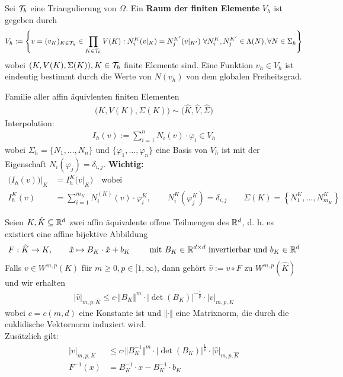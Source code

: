 \begin{definition}\enter
Sei $\mathcal{T}_h$ eine Triangulierung von $\Omega$. Ein \textbf{Raum der finiten Elemente} $V_h$ ist gegeben durch 
\begin{align*}
V_h:=\left\lbrace v=(v_{K})_{K\in\mathcal{T}_h}\in\prod\limits_{K\in\mathcal{T}_h} V(K):N_i^K(v|_K)=N_j^{K'}(v|_{K'})~\forall N_i^K,N_j^{K'}\in\Lambda(N),\forall N\in\Sigma_h\right\rbrace
\end{align*}
wobei $(K,V(K),\Sigma(K)),K\in\mathcal{T}_h$ finite Elemente sind. Eine Funktion $v_h\in V_h$ ist eindeutig bestimmt durch die Werte von $N(v_h)$ von dem globalen Freiheitsgrad.
\end{definition}

Familie aller affin äquivlenten finiten Elementen
\begin{align*}
\big(K,V(K),\Sigma(K)\big)\sim\big(\hat{K},\hat{V},\hat{\Sigma}\big)
\end{align*}
Interpolation:
\begin{align*}
I_h(v):=\sum\limits_{i=1}^n N_i(v)\cdot\varphi_i\in V_h
\end{align*}
wobei $\Sigma_h=\lbrace N_1,\ldots,N_n\rbrace\text{ und }\lbrace\varphi_1,\ldots,\varphi_n\rbrace$ eine Basis von $V_h$ ist mit der Eigenschaft $N_i(\varphi_j)=\delta_{i,j}$.\nl
\textbf{Wichtig: }
\begin{align*}
\big(I_h(v)\big)\big|_K&=I_h^K\big(v|_K\big)\quad\text{wobei}\\ I_h^K(v)&=\sum\limits_{i=1}^{m_K} N_i^{(K)}(v)\cdot\varphi_i^K,\qquad N_i^K(\varphi_j^K)=\delta_{i,j}\qquad\Sigma(K)=\left\lbrace N_1^K,\ldots,N_{m_K}^K\right\rbrace
\end{align*}

\begin{theorem}\label{theorem4.9}
Seien $K,\hat{K}\subseteq\mathbb{R}^d$ zwei affin äquivalente offene  Teilmengen des $\mathbb{R}^d$, d. h. es existiert eine affine bijektive Abbildung
\begin{align*}
F:\hat{K}\to K,\qquad \hat{x}\mapsto B_K\cdot\hat{x}+ b_K\qquad\text{ mit } B_K\in\mathbb{R}^{d\times d}\text{ invertierbar und }b_K\in\mathbb{R}^d
\end{align*}
Falls $v\in W^{m,p}(K)$ für $m\geq0,p\in[1,\infty)$, dann gehört $\hat{v}:=v\circ F$ zu $W^{m,p}(\hat{K})$ und wir erhalten
\begin{align*}
\big|\hat{v}\big|_{m,p,\hat{K}}\leq c\cdot\Vert B_K\Vert^m\cdot\big|\det(B_K)\big|^{-\frac{1}{p}}\cdot|v|_{m,p,K}
\end{align*}
wobei $c=c(m,d)$ eine Konstante ist und $\Vert\cdot\Vert$ eine Matrixnorm, die durch die euklidische Vektornorm induziert wird.\\
Zusätzlich gilt:
\begin{align*}
|v|_{m,p,K}&\leq c\cdot\Vert B_K^{-1}\Vert^m\cdot\big|\det(B_K)\big|^{\frac{1}{p}}\cdot|\hat{v}|_{m,p,\hat{K}}\\
F^{-1}(x)&=B_K^{-1}\cdot x-B_K^{-1}\cdot b_K
\end{align*}
\end{theorem}

